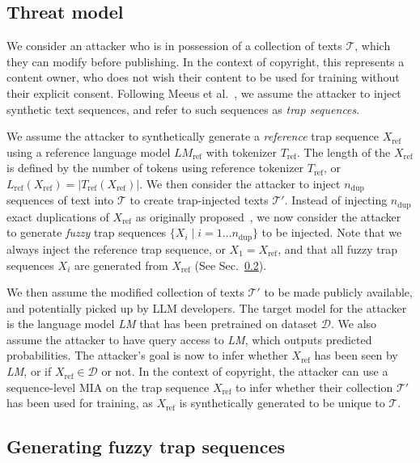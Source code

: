 
\subsection{Threat model}
\label{sec:threat_model}

We consider an attacker who is in possession of a collection of texts $\mathcal{T}$, which they can modify before publishing. In the context of copyright, this represents a content owner, who does not wish their content to be used for training without their explicit consent. Following Meeus et al.~\cite{meeus2024copyright}, we assume the attacker to inject synthetic text sequences, and refer to such sequences as \emph{trap sequences}.

We assume the attacker to synthetically generate a \emph{reference} trap sequence $X_{\text{ref}}$ using a reference language model $\textit{LM}_{\text{ref}}$ with tokenizer $T_{\text{ref}}$. The length of the $X_{\text{ref}}$ is defined by the number of tokens using reference tokenizer $T_{\text{ref}}$, or $L_{\text{ref}}(X_{\text{ref}}) = |T_{\text{ref}}(X_{\text{ref}})|$. We then consider the attacker to inject $n_{\text{dup}}$ sequences of text into $\mathcal{T}$ to create trap-injected texts $\mathcal{T}'$. Instead of injecting $n_{\text{dup}}$ exact duplications of $X_{\text{ref}}$ as originally proposed~\cite{meeus2024copyright}, we now consider the attacker to generate \emph{fuzzy} trap sequences $\{X_i \mid i=1 \ldots n_{\text{dup}}\}$ to be injected. Note that we always inject the reference trap sequence, or $X_1 = X_{\text{ref}}$, and that all fuzzy trap sequences $X_i$ are generated from $X_{\text{ref}}$ (See Sec.~\ref{sec:method_gen_fuzzy}).

We then assume the modified collection of texts $\mathcal{T}'$ to be made publicly available, and potentially picked up by LLM developers. The target model for the attacker is the language model \textit{LM} that has been pretrained on dataset $\mathcal{D}$. We also assume the attacker to have query access to \textit{LM}, which outputs predicted probabilities. The attacker's goal is now to infer whether $X_{\text{ref}}$ has been seen by \textit{LM}, or if $X_{\text{ref}} \in \mathcal{D}$ or not. In the context of copyright, the attacker can use a sequence-level MIA on the trap sequence $X_{\text{ref}}$ to infer whether their collection $\mathcal{T}'$ has been used for training, as $X_{\text{ref}}$ is synthetically generated to be unique to $\mathcal{T}$.

\subsection{Generating fuzzy trap sequences}
\label{sec:method_gen_fuzzy}

